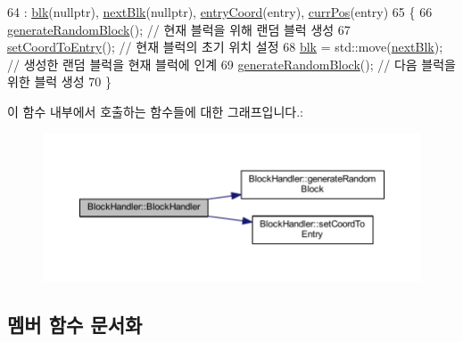 \begin{DoxyCode}
64         : \mbox{\hyperlink{class_block_handler_ab57212ded2552ab5559d278c8538c454}{blk}}(\textcolor{keyword}{nullptr}), \mbox{\hyperlink{class_block_handler_a7a7f96fa7c0d44f9e0fb5e52ebc9c428}{nextBlk}}(\textcolor{keyword}{nullptr}), \mbox{\hyperlink{class_block_handler_a5a2b1799763c46ced8a197775ca13fa7}{entryCoord}}(entry), 
      \mbox{\hyperlink{class_block_handler_a11bd634fdc179446f9c6751e2394999e}{currPos}}(entry) 
65     \{
66         \mbox{\hyperlink{class_block_handler_afaa88871c837a9af8fc407690aadffd6}{generateRandomBlock}}();       \textcolor{comment}{// 현재 블럭을 위해 랜덤 블럭 생성}
67         \mbox{\hyperlink{class_block_handler_aa0143a5722a52a91357c184354d484a6}{setCoordToEntry}}();           \textcolor{comment}{// 현재 블럭의 초기 위치 설정}
68         \mbox{\hyperlink{class_block_handler_ab57212ded2552ab5559d278c8538c454}{blk}} = std::move(\mbox{\hyperlink{class_block_handler_a7a7f96fa7c0d44f9e0fb5e52ebc9c428}{nextBlk}}); \textcolor{comment}{// 생성한 랜덤 블럭을 현재 블럭에 인계}
69         \mbox{\hyperlink{class_block_handler_afaa88871c837a9af8fc407690aadffd6}{generateRandomBlock}}();       \textcolor{comment}{// 다음 블럭을 위한 블럭 생성}
70     \}
\end{DoxyCode}
이 함수 내부에서 호출하는 함수들에 대한 그래프입니다.\+:
\nopagebreak
\begin{figure}[H]
\begin{center}
\leavevmode
\includegraphics[width=350pt]{class_block_handler_ae1955a1830df4398795c153ef54804fa_cgraph}
\end{center}
\end{figure}


\subsection{멤버 함수 문서화}
\mbox{\label{class_block_handler_afaa88871c837a9af8fc407690aadffd6}} 

